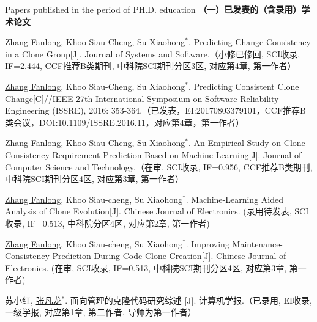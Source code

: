
 {Papers
published in the period of PH.D. education}
\noindent\textbf{（一）已发表的（含录用）学术论文}
\begin{publist}

\item
\underline{Zhang Fanlong}, Khoo Siau-Cheng, Su Xiaohong{$^*$}. Predicting Change Consistency in a Clone Group[J]. Journal of Systems and Software.（小修已修回, SCI收录, IF=2.444, CCF推荐B类期刊, 中科院SCI期刊分区3区, 对应第4章, 第一作者）

\item
\underline{Zhang Fanlong}, Khoo Siau-Cheng, Su Xiaohong{$^*$}. Predicting Consistent Clone Change[C]//IEEE 27th International Symposium on Software Reliability Engineering (ISSRE), 2016: 353-364.（已发表，EI:20170803379101，CCF推荐B类会议，DOI:10.1109/ISSRE.2016.11，对应第4章，第一作者）


\item
\underline{Zhang Fanlong},  Khoo Siau-Cheng, Su Xiaohong{$^*$}. An Empirical Study on Clone Consistency-Requirement Prediction Based on Machine Learning[J]. Journal of Computer Science and Technology.（在审, SCI收录, IF=0.956, CCF推荐B类期刊, 中科院SCI期刊分区4区, 对应第3章, 第一作者）

\item
\underline{Zhang Fanlong}, Khoo Siau-cheng, Su Xiaohong{$^*$}. Machine-Learning Aided Analysis of Clone Evolution[J]. Chinese Journal of Electronics. (录用待发表, SCI收录, IF=0.513, 中科院分区4区, 对应第2章, 第一作者)

\item
\underline{Zhang Fanlong}, Khoo Siau-cheng, Su Xiaohong{$^*$}. Improving Maintenance-Consistency Prediction During Code Clone Creation[J]. Chinese Journal of Electronics. (在审, SCI收录, IF=0.513, 中科院SCI期刊分区4区, 对应第3章, 第一作者)

\item 
苏小红, \underline{张凡龙}{$^*$}. 面向管理的克隆代码研究综述 [J]. 计算机学报.（已录用, EI收录, 一级学报, 对应第1章, 第二作者, 导师为第一作者）


\end{publist}
